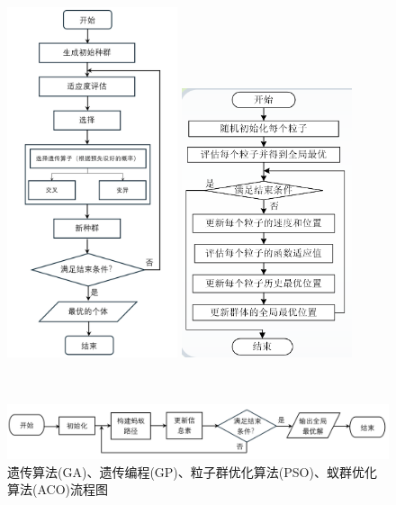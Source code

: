\documentclass[UTF8]{ctexart}
\begin{document}
\begin{figure}[p]
    \begin{minipage}[t]{.5\textwidth}
        \centering
        \includegraphics[width=5cm]{GA流程图.png}
    \end{minipage}
    \begin{minipage}[t]{.5\textwidth}
        \centering
        \includegraphics[width=5cm]{PSO流程图.png}
    \end{minipage} \\
    \begin{minipage}[t]{\textwidth}
        \centering
        \includegraphics[width=\textwidth]{ACO流程图.png}
    \end{minipage}
  \caption{遗传算法(GA)、遗传编程(GP)、粒子群优化算法(PSO)、蚁群优化算法(ACO)流程图}\label{fig:GA,GP,PSO}
\end{figure}
\end{document}
